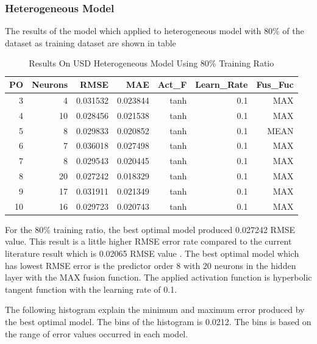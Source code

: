 {{{{\subsubsection{Heterogeneous Model}

The results of the model which applied to heterogeneous model with 80\% of the dataset as training dataset are shown in table

\setlength{\tabcolsep}{0.5em} %
{\renewcommand{\arraystretch}{1.2}
	\begin{table}[ht]
		
		\begin{tabular}{@{}rrrrrrr@{}}
			\toprule
			\textbf{PO}&\textbf{Neurons}& \textbf{RMSE} & \textbf{MAE} & \textbf{Act\_F} & \textbf{Learn\_Rate}&\textbf{ Fus\_Fuc} \\ 
			\midrule
			3 & 4 & 0.031532 & 0.023844 & tanh & 0.1 & MAX \\ 
			4 & 10 & 0.028456 & 0.021538 & tanh & 0.1 & MAX \\ 
			5 & 8 & 0.029833 & 0.020852 & tanh & 0.1 & MEAN \\ 
			6 & 7 & 0.036018 & 0.027498 & tanh & 0.1 & MAX \\ 
			7 & 8 & 0.029543 & 0.020445 & tanh & 0.1 & MAX \\ 
			8 & 20 & 0.027242 & 0.018329 & tanh & 0.1 & MAX \\ 
			9 & 17 & 0.031911 & 0.021349 & tanh & 0.1 & MAX \\ 
			10 & 16 & 0.029723 & 0.020743 & tanh & 0.1 & MAX \\ 
			\hline
		\end{tabular}
		\hspace*{1cm}
		\caption{Results On USD Heterogeneous Model Using 80\% Training Ratio }
	\end{table}	
	
	For the 80\% training ratio, the best optimal model  produced 0.027242 RMSE value. This result  is a little higher RMSE error rate compared to the current literature result which is 0.02065 RMSE value \cite{chan:2010}. The best optimal model which has lowest RMSE error is the predictor order 8 with 20 neurons in the hidden layer with the MAX fusion function. The applied activation function is hyperbolic tangent function with the learning rate of 0.1.
	
	The following histogram explain the minimum and maximum error produced by the best optimal model. The bins of the histogram is 0.0212. The bins is based on the range of error values occurred in each model.
	
}}}}}

